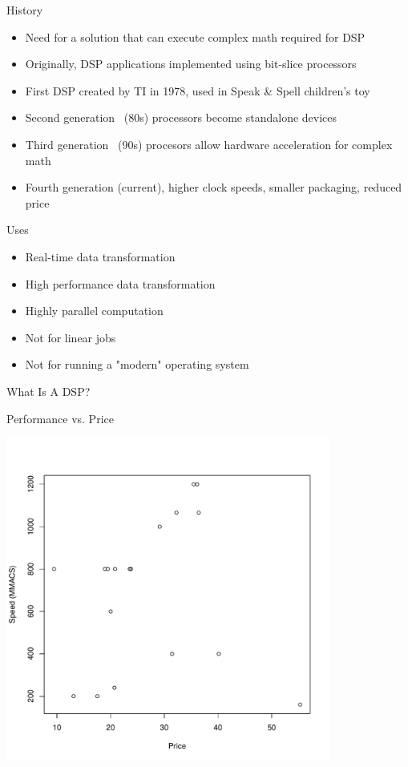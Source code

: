 \documentclass{beamer}
\begin{document}
\begin{frame}{History}
    \begin{itemize}
        \item Need for a solution that can execute complex math required for DSP
        \item Originally, DSP applications implemented using bit-slice processors
        \item First DSP created by TI in 1978, used in Speak & Spell children's toy
        \item Second generation ~(80s) processors become standalone devices
        \item Third generation ~(90s) procesors allow hardware acceleration for complex math
        \item Fourth generation (current), higher clock speeds, smaller packaging, reduced price
    \end{itemize}
\end{frame}

\begin{frame}{Uses}
    \begin{itemize}
        \item Real-time data transformation %
        \item High performance data transformation %
        \item Highly parallel computation %
        \item Not for linear jobs %
        \item Not for running a "modern" operating system %
    \end{itemize}
\end{frame}

\begin{frame}{What Is A DSP?}
\end{frame}

\begin{frame}{Performance vs. Price}
    \begin{center}
        \includegraphics[width=0.8\textwidth]{price_perf.pdf}
    \end{center}
\end{frame}
\end{document}
